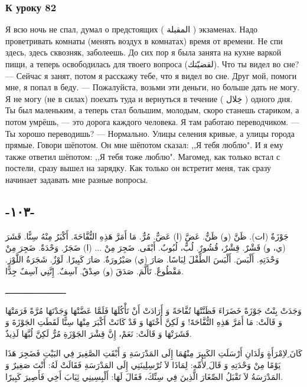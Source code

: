 \documentclass[a5paper]{article}
\newcommand\textstylePolicepardfaut[1]{#1}
\begin{document}
\subsubsection{К уроку 82}
Я всю ночь не спал, думал о предстоящих ( \textstylePolicepardfaut{المقبلة} ) экзаменах. Надо проветривать комнаты (менять воздух в комнатах) время от времени. Не спи здесь, здесь сквозняк, заболеешь. До сих пор я была занята на кухне варкой пищи, а теперь освободилась для твоего вопроса (لقضيّتك). Что ты видел во сне? — Сейчас я занят, потом я расскажу тебе, что я видел во сне. Друг мой, помоги мне, я попал в беду. — Пожалуйста, возьми эти деньги, но больше дать не могу. Я не могу (не в силах) поехать туда и вернуться в течение (َ خِلال ) одного дня. Ты был маленьким, а теперь стал большим, молодым, скоро станешь стариком, а потом умрёшь, — это дорога каждого человека. Я там работаю переводчиком. — Ты хорошо переводишь? — Нормально. Улицы селения кривые, а улицы города прямые. Говори шёпотом. Он мне шёпотом сказал: ,,Я тебя люблю". И я ему также ответил шёпотом: ,,Я тебя тоже люблю". Магомед, как только встал с постели, сразу вышел на зарядку. Как только он встретит меня, так сразу начинает задавать мне разные вопросы.

\subsection{-١٠٣-}
جَوْزَةٌ (ات). ظَنَّ (و) ظَنٌّ. عَضَّ (ا) عَضٌّ. مُرٌّ. مَا أَمَرَّ هَذِهِ التُّفَّاحَةَ. أَكْبَرُ مِنْهُ سِنًّا. قَشَرَ (ي، و) قَشْرٌ. قِشْرٌ، قُشُورٌ. لُبٌّ، لُبُوبٌ. أَبْقَى. ضَجِرَ مِنْ ... (ا) ضَجَرٌ. وَحْدَةٌ. ضَجِرَ مِنْ وَحْدَتِهِ. أَلْبَسَ. أَلْبَسَ الطِّفْلَ لِبَاسًا. صَارَ (ي) صَيْرُورَةٌ. صَارَ كَبِيرًا. لَوْزٌ. شَجَرَةُ اللَّوْزِ. مَقْطُوعٌ. تَأَلَّمَ. صَدَقَ (و) صِدْقٌ. آسِفٌ. إِنَّنِي آسِفٌ جِدًّا.

ـــــــــــــــــــــــــ

وَجَدَتْ بِنْتٌ جَوْزَةً خَضَرَاءَ فَظَنَّتْهَا تُفَّاحَةً وَ أَرَادَتْ أَنْ تَأْكُلَهَا فَلَمَّا عَضَّتْهَا وَجَدْتَهَا مُرَّةً فَرَمَتْهَا وَ قَالَتْ: مَا أَمَرَّ هَذِهِ التُّفَّاحَةََ! وَ لَكِنَّ أُخْتَهَا وَ قَدْ كَانَتْ أَكْبَرَ مِنْهَا سِنًّا لَقَطَتِ الجَوْزَةَ وَ قَشَرَتْهَا وَ قَالَتْ: نَعَمْ، إِنَّ قِشْرَ الجَوْزَةِ مُرٌّ لَكِنَّ لُبَّهَا لَذِيذٌ.

كَانَ ِلاِمْرَأَةٍ وَلَدَانِ أَرْسَلَتِ الكَبِيرَ مِنْهُمَا إِلَى المَدْرَسَةِ وَ أَبْقَتِ الصَّغِيرَ فِي البَيْتِ فَضَجِرَ هَذَا يَوْمًا مِنْ وَحْدَتِهِ وَ قَالَ ِلأُمِّهِ: لِمَاذَا لاَ تُرْسِلِينَنِي إِلَى المَدْرَسَةِ فَقَالَتْ لَهُ: أَنْتَ صَغِيرٌ وَ المَدْرَسَةُ لاَ تَقْبَلُ الصِّغَارَ الَّذِينَ فِي سِنِّكَ، فَقَالَ لَهَا: أَلْبِسِينِي ثِيَابَ أَخِي فَأَصِيرَ كَبِيرًا.
\end{document}

